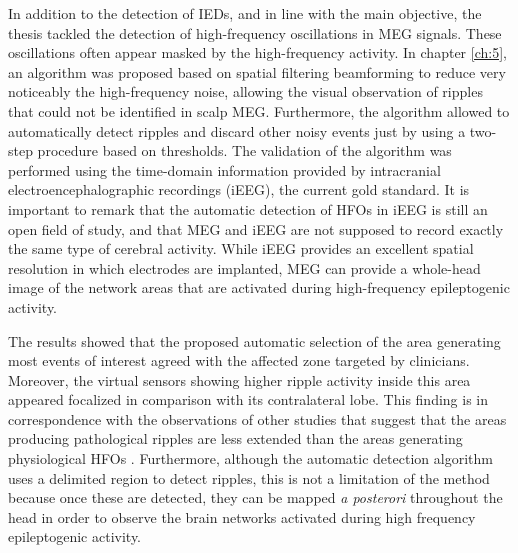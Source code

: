 In addition to the detection of IEDs, and in line with the main objective, the thesis tackled the detection of high-frequency oscillations in MEG signals. These oscillations often appear masked by the high-frequency activity. In chapter \ref{ch:5}, an algorithm was proposed based on spatial filtering beamforming to reduce very noticeably the high-frequency noise, allowing the visual observation of ripples that could not be identified in scalp MEG. Furthermore, the algorithm allowed to automatically detect ripples and discard other noisy events just by using a two-step procedure based on thresholds. The validation of the algorithm was performed using the time-domain information provided by intracranial electroencephalographic recordings (iEEG), the current gold standard. It is important to remark that the automatic detection of HFOs in iEEG is still an open field of study, and that MEG and iEEG are not supposed to record exactly the same type of cerebral activity. While iEEG provides an excellent spatial resolution in which electrodes are implanted, MEG can provide a whole-head image of the network areas that are activated during high-frequency epileptogenic activity.  


The results showed that the proposed automatic selection of the area generating most events of interest agreed with the affected zone targeted by clinicians. Moreover, the virtual sensors showing higher ripple activity inside this area appeared focalized in comparison with its contralateral lobe. This finding is in correspondence with the observations of other studies that suggest that the areas producing pathological ripples are less extended than the areas generating physiological HFOs \citep{Chrobak1996,Bragin2002}. Furthermore, although the automatic detection algorithm uses a delimited region to detect ripples, this is not a limitation of the method because once these are detected, they can be mapped \emph{a posterori} throughout the head in order to observe the brain networks activated during high frequency epileptogenic activity. 

